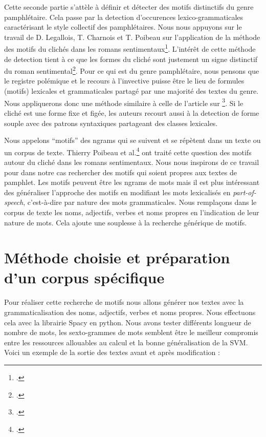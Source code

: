 Cette seconde partie s'attèle à définir et détecter des motifs distinctifs du genre pamphlétaire. Cela passe par la detection d'occurences lexico-grammaticales caractérisant le style collectif des pamphlétaires. Nous nous appuyons sur le travail de D. Legallois, T. Charnois et T. Poibeau sur l'application de la méthode des motifs du clichés dans les romans sentimentaux\footcites{legallois_reperer_2016}. L'intérêt de cette méthode de detection tient à ce que les formes du cliché sont justement un signe distinctif du roman sentimental\footcites{van_cranenburgh_cliche_nodate}. Pour ce qui est du genre pamphlétaire, nous pensons que le registre polémique et le recours à l'invective puisse être le lieu de formules (motifs) lexicales et grammaticales partagé par une majorité des textes du genre. Nous appliquerons donc une méthode similaire à celle de l'article sur \footcites{legallois_reperer_2016}. Si le cliché est une forme fixe et figée, les auteurs recourt aussi à la detection de forme souple avec des patrons syntaxiques partageant des classes lexicales. \par
Nous appelons \enquote{motifs} des ngrams qui se suivent et se répètent dans un texte ou un corpus de texte. Thierry Poibeau et al.\footcites{legallois_reperer_2016} ont traité cette question des motifs autour du cliché dans les romans sentimentaux. Nous nous inspirons de ce travail pour dans notre cas rechercher des motifs qui soient propres aux textes de pamphlet. Les motifs peuvent être les ngrams de mots mais il est plus intéressant des généraliser l'approche des motifs en modifiant les mots lexicalisés en \textit{part-of-speech}, c'est-à-dire par nature des mots grammaticales. Nous remplaçons dans le corpus de texte les noms, adjectifs, verbes et noms propres en l'indication de leur nature de mots. Cela ajoute une souplesse à la recherche générique de motifs.

\section{Méthode choisie et préparation d'un corpus spécifique}

Pour réaliser cette recherche de motifs nous allons générer nos textes avec la grammaticalisation des noms, adjectifs, verbes et noms propres. Nous effectuons cela avec la librairie Spacy en python. Nous avons tester différents longueur de nombre de mots, les sexto-grammes de mots semblent être le meilleur compromis entre les ressources allouables au calcul et la bonne généralisation de la SVM. Voici un exemple de la sortie des textes avant et après modification : \par

